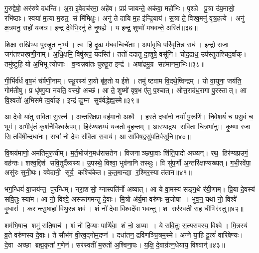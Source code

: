 गु॒रुद्वेषो॒ अर॑रुषे दधन्ति।
अ॒रा इ॒वेदच॑रमा॒ अहे॑व।
प्रप्र॑ जायन्ते॒ अक॑वा॒ महो॑भिः।
पृश्ञे प्रु॒त्रा उ॑प॒मासो॒ रभि॑ष्ठाः।
स्वया॑ म॒त्या म॒रुत॒ सं मि॑मिक्षुः।
अनु॑ ते दायि म॒ह इ॑न्द्रि॒याय॑।
स॒त्रा ते॒ विश्व॒मनु॑ वृत्र॒हत्ये।
अनु॑ क्ष॒त्रमनु॒ सहो॑ यजत्र।
इन्द्र॑ दे॒वेभि॒रनु॑ ते नृ॒षह्ये।
य इन्द्र॒ शुष्मो॑ मघवन्ते॒ अस्ति॑॥३७॥

शिक्षा॒ सखि॑भ्यः पुरुहूत॒ नृभ्य॑।
त्व हि दृ॒ढा म॑घव॒न्विचे॑ताः।
अपा॑वृधि॒ परि॑वृति॒न्न राध॑।
इन्द्रो॒ राजा॒ जग॑तश्चर्‌षणी॒नाम्।
अ॒धि॒क्षमि॒ विषु॑रूपं॒ यदस्ति॑।
ततो॑ ददातु दा॒शुषे॒ वसू॑नि।
चोद॒द्राध॒ उप॑स्तुतश्चिद॒र्वाक्।
तमु॑ष्टुहि॒ यो अ॒भिभूत्योजाः।
व॒न्वन्नवा॑तः पुरुहू॒त इन्द्र॑।
अषा॑ढमु॒ग्र सह॑मानमा॒भिः॥३८॥

गी॒र्भिर्व॑र्ध वृष॒भं च॑र्\mbox{}षणी॒नाम्।
स्थू॒रस्य॑ रा॒यो बृ॑ह॒तो य ईशे।
तमु॑ ष्टवाम वि॒दथे॒ष्विन्द्रम्।
यो वा॒युना॒ जय॑ति॒ गोम॑तीषु।
प्र धृ॑ष्णु॒या न॑यति॒ वस्यो॒ अच्छ॑।
आ ते॒ शुष्मो॑ वृष॒भ ए॑तु प॒श्चात्।
ओत्त॒राद॑ध॒रागा पु॒रस्तात्।
आ वि॒श्वतो॑ अ॒भिसमेत्व॒र्वाङ्।
इन्द्र॑ द्यु॒म्न सुव॑र्वद्धेह्य॒स्मे॥३९॥\anuvakamend[व॒राहैर्वि॒श्वहा॑ऽजनिष्ट पू॒षोद्वरी॑वृजत्खा॒दयो॑ वः पा॒न्त्यस्त्या॒भिर्नव॑ च]

आ दे॒वो या॑तु सवि॒ता सु॒रत्न॑।
अ॒न्त॒रि॒क्ष॒प्रा वह॑मानो॒ अश्वै।
हस्ते॒ दधा॑नो॒ नर्या॑ पु॒रूणि॑।
नि॒वे॒शयं॑ च प्रसु॒वं च॒ भूम॑।
अ॒भीवृ॑तं॒ कृश॑नैर्वि॒श्वरू॑पम्।
हिर॑ण्यशम्यं यज॒तो बृ॒हन्तम्।
आस्था॒द्रथ सवि॒ता चि॒त्रभा॑नुः।
कृ॒ष्णा रजा सि॒ तवि॑षी॒न्दधा॑नः।
सघा॑ नो दे॒वः स॑वि॒ता स॒वाय॑।
आ सा॑विष॒द्वसु॑पति॒र्वसू॑नि॥४०॥

वि॒श्रय॑माणो॒ अम॑तिमुरू॒चीम्।
म॒र्त॒भोज॑न॒मध॑रासतेन।
विजनाञ्छ्या॒वाः शि॑ति॒पादो॑ अख्यन्।
रथ॒ हिर॑ण्यप्रउगं॒ वह॑न्तः।
शश्व॒द्दिश॑ सवि॒तुर्दैव्य॑स्य।
उ॒पस्थे॒ विश्वा॒ भुव॑नानि तस्थुः।
वि सु॑प॒र्णो अ॒न्तरि॑क्षाण्यख्यत्।
ग॒भी॒रवे॑पा॒ असु॑रः सुनी॒थः।
क्वे॑दानी॒ सूर्य॒ कश्चि॑केत।
क॒त॒मान्द्या र॒श्मिर॒स्या त॑तान॥४१॥

भग॒न्धियं॑ वा॒जय॑न्त॒ पुर॑न्धिम्।
नरा॒शसो॒ ग्नास्पति॑र्नो अव्यात्।
आ ये वा॒मस्य॑ सङ्ग॒थे र॑यी॒णाम्।
प्रि॒या दे॒वस्य॑ सवि॒तुः स्या॑म।
आ नो॒ विश्वे॒ अस्क्रा॑गमन्तु दे॒वाः।
मि॒त्रो अ॑र्य॒मा वरु॑णः स॒जोषा।
भुव॒न्॒ यथा॑ नो॒ विश्वे॑ वृ॒धास॑।
करन्त्सु॒षाहा॑ विथु॒रन्न शव॑।
शं नो॑ दे॒वा वि॒श्वदे॑वा भवन्तु।
श सर॑स्वती स॒ह धी॒भिर॑स्तु॥४२॥

शम॑भि॒षाच॒ शमु॑ राति॒षाच॑।
शं नो॑ दि॒व्याः पार्थि॑वा॒ शं नो॒ अप्या।
ये स॑वि॒तुः स॒त्यस॑वस्य॒ विश्वे।
मि॒त्रस्य॑ व्र॒ते वरु॑णस्य दे॒वाः।
ते सौभ॑गं वी॒रव॒द्गोम॒दप्न॑।
दधा॑तन॒ द्रवि॑णञ्चि॒त्रम॒स्मे।
अग्ने॑ या॒हि दू॒त्यं॑ वारि॑षेण्यः।
दे॒वा अच्छा ब्रह्म॒कृता॑ ग॒णेन॑।
सर॑स्वतीं म॒रुतो॑ अ॒श्विना॒पः।
य॒क्षि॒ दे॒वान्र॑त्न॒धेया॑य॒ विश्वान्॑॥४३॥

